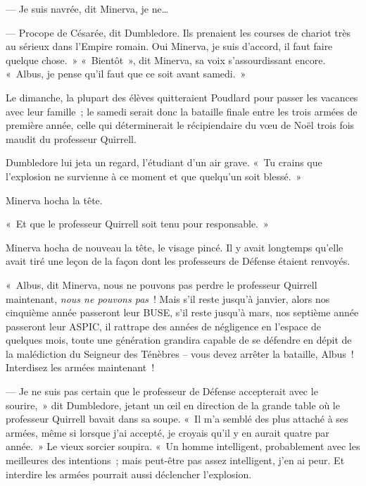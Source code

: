 --- Je suis navrée, dit Minerva, je ne…

--- Procope de Césarée\footnotemark{}, dit Dumbledore. Ils prenaient les courses de chariot très au sérieux dans l'Empire romain. Oui Minerva, je suis d'accord, il faut faire quelque chose.~»
«~Bientôt~», dit Minerva, sa voix s'assourdissant encore. «~Albus, je pense qu'il faut que ce soit avant samedi.~»

Le dimanche, la plupart des élèves quitteraient Poudlard pour passer les vacances avec leur famille~; le samedi serait donc la bataille finale entre les trois armées de première année, celle qui déterminerait le récipiendaire du vœu de Noël trois fois maudit du professeur Quirrell.

Dumbledore lui jeta un regard, l'étudiant d'un air grave. «~Tu crains que l'explosion ne survienne à ce moment et que quelqu'un soit blessé.~»

Minerva hocha la tête.

«~Et que le professeur Quirrell soit tenu pour responsable.~»

Minerva hocha de nouveau la tête, le visage pincé. Il y avait longtemps qu'elle avait tiré une leçon de la façon dont les professeurs de Défense étaient renvoyés.

«~Albus, dit Minerva, nous ne pouvons pas perdre le professeur Quirrell maintenant, \emph{nous ne pouvons pas}~! Mais s'il reste jusqu'à janvier, alors nos cinquième année passeront leur BUSE, s'il reste jusqu'à mars, nos septième année passeront leur ASPIC, il rattrape des années de négligence en l'espace de quelques mois, toute une génération grandira capable de se défendre en dépit de la malédiction du Seigneur des Ténèbres -- vous devez arrêter la bataille, Albus~! Interdisez les armées maintenant~!

--- Je ne suis pas certain que le professeur de Défense accepterait avec le sourire,~» dit Dumbledore, jetant un œil en direction de la grande table où le professeur Quirrell bavait dans sa soupe. «~Il m'a semblé des plus attaché à ses armées, même si lorsque j'ai accepté, je croyais qu'il y en aurait quatre par année.~» Le vieux sorcier soupira. «~Un homme intelligent, probablement avec les meilleures des intentions~; mais peut-être pas assez intelligent, j'en ai peur. Et interdire les armées pourrait aussi déclencher l'explosion.

